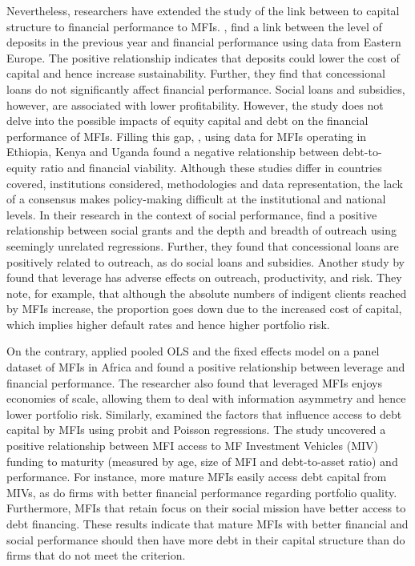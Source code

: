 \documentclass[a4paper,nobind]{templates/ociamthesis}
\begin{document}
Nevertheless, researchers have extended the study of the link between to capital structure to financial performance to MFIs. \textcite{khachatryan2017performance}, find a link between the level of deposits in the previous year and financial performance using data from Eastern Europe. The positive relationship indicates that deposits could lower the cost of capital and hence increase sustainability. Further, they find that concessional loans do not significantly affect financial performance. Social loans and subsidies, however, are associated with lower profitability. However, the study does not delve into the possible impacts of equity capital and debt on the financial performance of MFIs. Filling this gap, \textcite{ayele2015microfinance}, using data for MFIs operating in Ethiopia, Kenya and Uganda found a negative relationship between debt-to-equity ratio and financial viability. Although these studies differ in countries covered, institutions considered, methodologies and data representation, the lack of a consensus makes policy-making difficult at the institutional and national levels.
In their research in the context of social performance, \textcite{khachatryan2017performance} find a positive relationship between social grants and the depth and breadth of outreach using seemingly unrelated regressions. Further, they found that concessional loans are positively related to outreach, as do social loans and subsidies. Another study by \textcite{hoque2011commercialization} found that leverage has adverse effects on outreach, productivity, and risk. They note, for example, that although the absolute numbers of indigent clients reached by MFIs increase, the proportion goes down due to the increased cost of capital, which implies higher default rates and hence higher portfolio risk.

On the contrary, \textcite{kyereboah2007determinants} applied pooled OLS and the fixed effects model on a panel dataset of MFIs in Africa and found a positive relationship between leverage and financial performance. The researcher also found that leveraged MFIs enjoys economies of scale, allowing them to deal with information asymmetry and hence lower portfolio risk. Similarly, \textcite{dorfleitner2017access} examined the factors that influence access to debt capital by MFIs using probit and Poisson regressions. The study uncovered a positive relationship between MFI access to MF Investment Vehicles (MIV) funding to maturity (measured by age, size of MFI and debt-to-asset ratio) and performance. For instance, more mature MFIs easily access debt capital from MIVs, as do firms with better financial performance regarding portfolio quality. Furthermore, MFIs that retain focus on their social mission have better access to debt financing. These results indicate that mature MFIs with better financial and social performance should then have more debt in their capital structure than do firms that do not meet the criterion.
\end{document}
